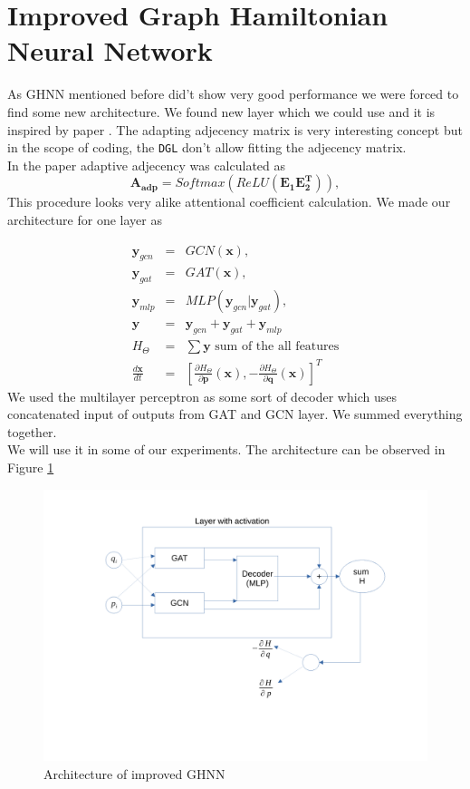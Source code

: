 \section{Improved Graph Hamiltonian Neural Network}
As GHNN mentioned before did't show very good performance we were forced to find some new architecture. We found new layer which we could use and it is inspired by paper \cite{wave}. The adapting adjecency matrix is very interesting concept but in the scope of coding, the \texttt{DGL} don't allow fitting the adjecency matrix.\\
In the paper adaptive adjecency was calculated as
\begin{equation}
	\mathbf{A_{adp}} = Softmax(ReLU(\mathbf{E_1}\mathbf{E_2^T})),
\end{equation}
This procedure looks very alike attentional coefficient calculation.
We made our architecture for one layer as

\begin{eqnarray}
	\mathbf{y}_{gcn} &=& GCN(\mathbf{x}),\\
	\mathbf{y}_{gat} &=& GAT(\mathbf{x}),\\
	\mathbf{y}_{mlp} &=& MLP(\mathbf{y}_{gcn}|\mathbf{y}_{gat}),\\
	\mathbf{y} &=& \mathbf{y}_{gcn}+\mathbf{y}_{gat}+\mathbf{y}_{mlp}\\
	H_{\Theta} &=& \sum \mathbf{y} \text{   sum of the all features}\\
	\frac{d\mathbf{x}}{dt} &=& \left[\frac{\partial H_{\Theta}}{\partial\mathbf{p}}(\mathbf{x}),-\frac{\partial H_{\Theta}}{\partial\mathbf{q}}(\mathbf{x})\right]^T
\end{eqnarray}
We used the multilayer perceptron as some sort of decoder which uses concatenated input of outputs from GAT and GCN layer. We summed everything together.\\
We will use it in some of our experiments. The architecture can be observed in Figure \ref{improvedGHNN}

\begin{figure}[h!]
	\includegraphics[width=15cm]{chapters/chapter4/improved_GHNN.pdf}
	
	\caption{Architecture of improved GHNN}
	\label{improvedGHNN}
\end{figure}

